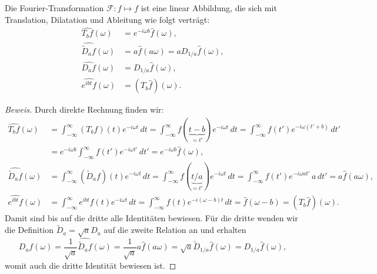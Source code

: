 \begin{satz}
\label{four-int:trans-dial}
Die Fourier-Transformation $\mathcal F\colon f\mapsto f$ ist eine linear
Abbildung, die sich mit Translation, Dilatation und Ableitung wie folgt
verträgt:
\begin{align*}
\widehat{T_bf}(\omega)
&=
e^{-i\omega b}\hat{f}(\omega),
\\
\widehat{\tilde{D}_af}(\omega)
&=
a \hat{f}(a\omega)
=
a D_{1/a} \hat{f}(\omega),
\\
\widehat{D_af}(\omega)
&=
D_{1/a}\hat{f}(\omega),
\\
\widehat{e^{ibt}f}(\omega)
&=
(T_b\hat{f})(\omega).
\end{align*}
\end{satz}

\begin{proof}[Beweis]
Durch direkte Rechnung finden wir:
\begin{align*}
\widehat{T_bf}(\omega)
&=
\int_{-\infty}^{\infty} (T_bf)(t)e^{-i\omega t}\,dt
=
\int_{-\infty}^{\infty} f(\underbrace{t-b}_{\displaystyle=t'})e^{-i\omega t}\,dt
=
\int_{-\infty}^{\infty} f(t')e^{-i\omega(t'+b)}\,dt'
\\
&=
e^{-i\omega b}
\int_{-\infty}^{\infty} f(t')e^{-i\omega t'}\,dt'
=
e^{-i\omega b}\hat{f}(\omega),
\\
\widehat{\tilde{D}_af}(\omega)
&=
\int_{-\infty}^\infty (\tilde{D}_af)(t)e^{-i\omega t}\,dt
=
\int_{-\infty}^\infty f(\underbrace{t/a}_{\displaystyle=t'})e^{-i\omega t}\,dt
=
\int_{-\infty}^\infty f(t')e^{-i\omega at'}\,a\,dt'
=
a \hat{f}(a\omega),
\\
\widehat{e^{ibt}f}(\omega)
&=
\int_{-\infty}^\infty e^{ibt}f(t)e^{-i\omega t}\,dt
=
\int_{-\infty}^\infty f(t)e^{-i(\omega -b)t}\,dt
=
\hat{f}(\omega-b)
=
(T_b\hat{f})(\omega).
\end{align*}
Damit sind bis auf die dritte alle Identitäten bewiesen.
Für die dritte wenden wir die Definition $\tilde{D}_a = \sqrt{a}D_a$
auf die zweite Relation an und erhalten
\[
\widehat{D_af}(\omega)
=
\frac{1}{\sqrt{a}}
\widehat{\tilde{D}_af}(\omega)
=
\frac{1}{\sqrt{a}}
a\hat{f}(a\omega)
=
\sqrt{a} \tilde{D}_{1/a}\hat{f}(\omega)
=
D_{1/a}\hat{f}(\omega),
\]
womit auch die dritte Identität bewiesen ist.
\end{proof}

